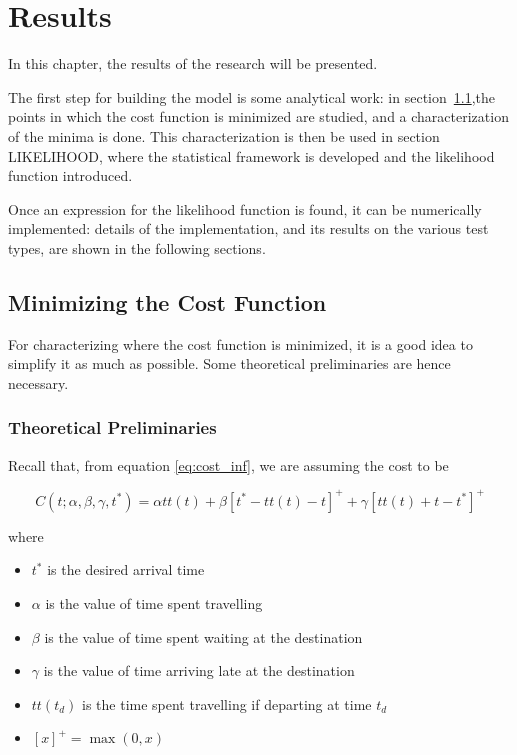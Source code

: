 \chapter{Results}
\label{chap:res}

In this chapter, the results of the research will be presented.

The first step for building the model is some analytical work:
in section~\ref{sec:minimum},the points in which the cost function is minimized are studied,
and a characterization of the minima is done.
This characterization is then be used in section LIKELIHOOD,
where the statistical framework is developed and the likelihood function introduced.

Once an expression for the likelihood function is found,
it can be numerically implemented:
details of the implementation, and its results on the various test types,
are shown in the following sections.

\section{Minimizing the Cost Function}
\label{sec:minimum}

For characterizing where the cost function is minimized,
it is a good idea to simplify it as much as possible.
Some theoretical preliminaries are hence necessary.

\subsection{Theoretical Preliminaries}
\label{sec:pre_minimizing}

Recall that, from equation \eqref{eq:cost_inf}, we are assuming the cost to be

\begin{equation*}
  C(t; \alpha, \beta, \gamma, t^*) = \alpha tt(t) + \beta [t^* - tt(t) - t]^+ + \gamma[tt(t) + t - t^*]^+
\end{equation*}

where

\begin{itemize}
\item \(t^*\) is the desired arrival time
\item \(\alpha\) is the value of time spent travelling
\item \(\beta\) is the value of time spent waiting at the destination
\item \(\gamma\) is the value of time arriving late at the destination
\item \(tt(t_d)\) is the time spent travelling if departing at time \(t_d\)
\item \([x]^+ = \max(0, x)\)
\end{itemize}

